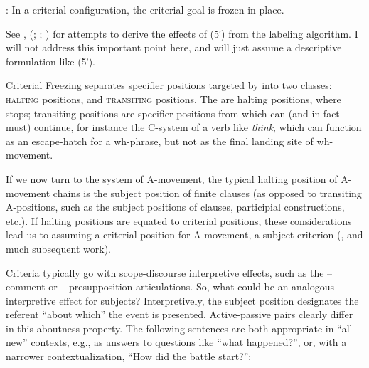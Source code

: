 \documentclass[output=paper]{langsci/langscibook}
\begin{document}
\begin{exe}
     : In a criterial configuration, the criterial
    goal is frozen in place.\label{ex:key:21.5prime}
\z

See \textcite{Chomsky2013,Chomsky2015}, \citeauthor{Rizzi2015}
(\citeyear{Rizzi2015}; \citeyear{Rizzi2015b}; \citeyear{Rizzi2016a}) for
attempts to derive the effects of (5ʹ) from the labeling algorithm. I will not
address this important point here, and will just assume a descriptive
formulation like (5ʹ).

Criterial Freezing separates specifier positions
targeted by  into two classes: \textsc{halting} positions, and
\textsc{transiting} positions. The  are halting
positions, where  stops; transiting positions are specifier positions
from which  can (and in fact must) continue, for instance the C-system
of a verb like \emph{think}, which can function as an escape-hatch for a
wh-phrase, but not as the final landing site of wh-movement.

If we now turn to the system of A-movement, the typical halting position of
A-movement chains is the subject position of finite clauses (as opposed to
transiting A-positions, such as the subject positions of  clauses,
participial constructions, etc.). If halting positions are equated to criterial
positions, these considerations lead us to assuming a criterial position for
A-movement, a subject criterion (\citealt{rizzicriterial}, and much subsequent
work).

Criteria typically go with scope-discourse interpretive effects, such as the
 – comment or  – presupposition articulations. So, what could be an
analogous interpretive effect for subjects? Interpretively, the subject
position designates the referent “about which” the event is presented.
Active-passive pairs clearly differ in this aboutness property. The following
sentences are both appropriate in “all new” contexts, e.g., as answers to
questions like “what happened?”, or, with a narrower contextualization, “How
did the battle start?”:


\end{exe}
\end{document}

